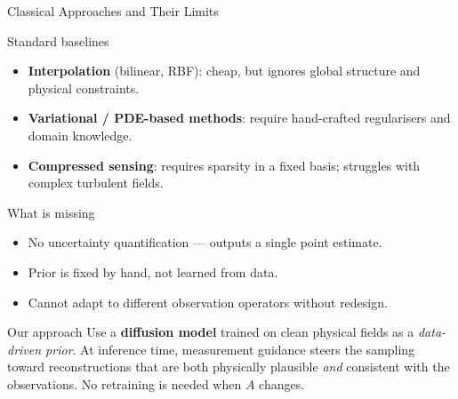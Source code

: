 \documentclass[9pt]{beamer}
\begin{document}
\begin{frame}{Classical Approaches and Their Limits}
\begin{block}{Standard baselines}
\begin{itemize}
  \item \textbf{Interpolation} (bilinear, RBF): cheap, but ignores global structure and physical constraints.
  \item \textbf{Variational / PDE-based methods}: require hand-crafted regularisers and domain knowledge.
  \item \textbf{Compressed sensing}: requires sparsity in a fixed basis; struggles with complex turbulent fields.
\end{itemize}
\end{block}
\begin{block}{What is missing}
\begin{itemize}
  \item No uncertainty quantification — outputs a single point estimate.
  \item Prior is fixed by hand, not learned from data.
  \item Cannot adapt to different observation operators without redesign.
\end{itemize}
\end{block}
\begin{alertblock}{Our approach}
Use a \textbf{diffusion model} trained on clean physical fields as a \emph{data-driven prior}.
At inference time, measurement guidance steers the sampling toward reconstructions that are
both physically plausible \emph{and} consistent with the observations.
No retraining is needed when $A$ changes.
\end{alertblock}
\end{frame}

\end{document}

